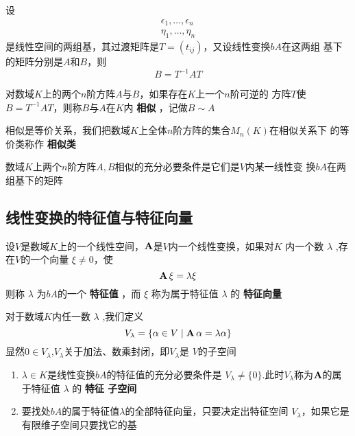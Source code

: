 \documentclass[11pt]{article}
\begin{document}
\begin{enumerate}
\begin{proposition}[]
设
\begin{align*}
\epsilon_1,\dots,\epsilon_n\\
\eta_1,\dots,\eta_n
\end{align*}
是线性空间的两组基，其过渡矩阵是\(T=(t_{ij})\)，又设线性变换\(bA\)在这两组
基下的矩阵分别是\(A\)和\(B\)，则
\begin{equation*}
B=T^{-1}AT
\end{equation*}
\end{proposition}
\end{enumerate}
\begin{definition}
对数域\(K\)上的两个\(n\)阶方阵\(A\)与\(B\)，如果存在\(K\)上一个\(n\)阶可逆的
方阵\(T\)使\(B=T^{-1}AT\)，则称\(B\)与\(A\)在\(K\)内 \textbf{相似} ，记做\(B\sim A\)
\end{definition}

相似是等价关系，我们把数域\(K\)上全体\(n\)阶方阵的集合\(M_n(K)\)在相似关系下
的等价类称作 \textbf{相似类}

\begin{proposition}[]
数域\(K\)上两个\(n\)阶方阵\(A,B\)相似的充分必要条件是它们是\(V\)内某一线性变
换\(bA\)在两组基下的矩阵
\end{proposition}
\subsection{线性变换的特征值与特征向量}
\label{sec:org46406ce}
\begin{definition}[]
设\(V\)是数域\(K\)上的一个线性空间，\(\operatorname{\textbf{A}}\)是\(V\)内一个线性变换，如果对\(K\)
内一个数 \(\lambda\) ,存在\(V\)的一个向量 \(\xi\neq0\)，使
\begin{equation*}
\operatorname{\textbf{A}}\xi=\lambda\xi
\end{equation*}
则称 \(\lambda\) 为\(bA\)的一个 \textbf{特征值} ，而 \(\xi\) 称为属于特征值 \(\lambda\) 的 \textbf{特征向量}
\end{definition}

对于数域\(K\)内任一数 \(\lambda\) ,我们定义
\begin{equation*}
V_\lambda=\{\alpha\in V\mid\operatorname{\textbf{A}}\alpha=\lambda\alpha\}
\end{equation*}
显然\(0\in V_\lambda\),\(V_\lambda\)关于加法、数乘封闭，即\(V_\lambda\)是
\(V\)的子空间
\begin{enumerate}
\item \(\lambda\in K\)是线性变换\(bA\)的特征值的充分必要条件是
\(V_\lambda\neq\{0\}\).此时\(V_\lambda\)称为\(\operatorname{\textbf{A}}\)的属于特征值 \(\lambda\) 的 \textbf{特征
子空间}
\item 要找处\(bA\)的属于特征值\(\lambda\)的全部特征向量，只要决定出特征空间
\(V_\lambda\)，如果它是有限维子空间只要找它的基
\end{enumerate}
\end{document}

